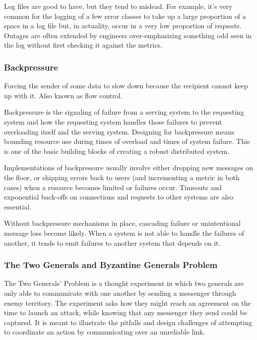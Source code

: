 \documentclass{article}
\begin{document}
    Log files are good to have, but they tend to mislead. For example, it’s very common for the logging of a few error classes to take up a large proportion of a space in a log file but, in actuality, occur in a very low proportion of requests. Outages are often extended by engineers over-emphasizing something odd seen in the log without first checking it against the metrics.
    
    
    \subsubsection{Backpressure}
    Forcing the sender of some data to slow down because the recipient cannot keep up with it. Also known as flow control.
    
    Backpressure is the signaling of failure from a serving system to the requesting system and how the requesting system handles those failures to prevent overloading itself and the serving system. Designing for backpressure means bounding resource use during times of overload and times of system failure. This is one of the basic building blocks of creating a robust distributed system.
    
    Implementations of backpressure usually involve either dropping new messages on the floor, or shipping errors back to users (and incrementing a metric in both cases) when a resource becomes limited or failures occur. Timeouts and exponential back-offs on connections and requests to other systems are also essential.

    Without backpressure mechanisms in place, cascading failure or unintentional message loss become likely. When a system is not able to handle the failures of another, it tends to emit failures to another system that depends on it.
    
    \subsubsection{The Two Generals and Byzantine Generals Problem}
    The Two Generals' Problem is a thought experiment in which two generals are only able to communicate with one another by sending a messenger through enemy territory. The experiment asks how they might reach an agreement on the time to launch an attack, while knowing that any messenger they send could be captured. It is meant to illustrate the pitfalls and design challenges of attempting to coordinate an action by communicating over an unreliable link.
    
\end{document}
